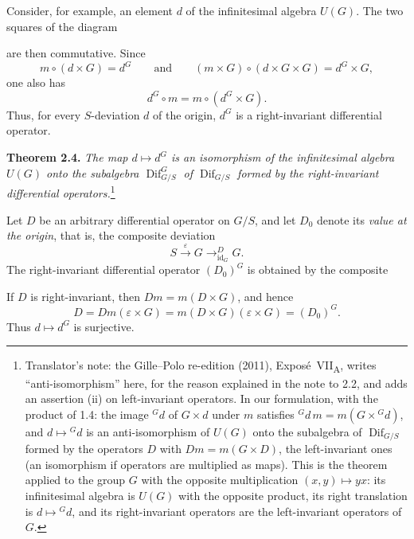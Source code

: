 Consider, for example, an element \(d\) of the infinitesimal algebra
\(U(G)\). The two squares of the diagram
\begin{center}
  \label{sga3:VIIA:2.3-origin-deviation-invariant}
  
\end{center}
are then commutative. Since
\[
  m\circ(d\times G)=d^G
  \qquad\text{and}\qquad
  (m\times G)\circ(d\times G\times G)=d^G\times G,
\]
one also has
\[
  d^G\circ m=m\circ(d^G\times G).
\]
Thus, for every \(S\)-deviation \(d\) of the origin, \(d^G\) is a
right-invariant differential operator.

\medskip
\noindent\textbf{Theorem 2.4.}
\label{sga3:VIIA:2.4}
\textit{The map \(d\mapsto d^G\) is an isomorphism of the infinitesimal
algebra \(U(G)\) onto the subalgebra \(\operatorname{Dif}^{G}_{G/S}\) of
\(\operatorname{Dif}_{G/S}\) formed by the right-invariant differential
operators.}\footnote{Translator's note: the Gille--Polo re-edition
(2011), Expos\'e~VII\textsubscript{A}, writes ``anti-isomorphism'' here,
for the reason explained in the note to 2.2, and adds an assertion (ii)
on left-invariant operators. In our formulation, with the product of
1.4: the image \({}^Gd\) of \(G\times d\) under \(m\) satisfies
\({}^Gd\,m=m(G\times{}^Gd)\), and \(d\mapsto{}^Gd\) is an
anti-isomorphism of \(U(G)\) onto the subalgebra of
\(\operatorname{Dif}_{G/S}\) formed by the operators \(D\) with
\(Dm=m(G\times D)\), the left-invariant ones (an isomorphism if
operators are multiplied as maps). This is the theorem applied to the
group \(G\) with the opposite multiplication \((x,y)\mapsto yx\): its
infinitesimal algebra is \(U(G)\) with the opposite product, its right
translation is \(d\mapsto{}^Gd\), and its right-invariant operators are
the left-invariant operators of \(G\).}

Let \(D\) be an arbitrary differential operator on \(G/S\), and let
\(D_0\) denote its \emph{value at the origin}, that is, the composite
deviation
\[
  S\xrightarrow{\varepsilon}G
   \mathop{\longrightarrow}^{D}_{\operatorname{id}_G}G.
\]
The right-invariant differential operator \((D_0)^G\) is obtained by
the composite
\begin{center}
  \label{sga3:VIIA:2.4-D0-composite}
  
\end{center}
If \(D\) is right-invariant, then \(Dm=m(D\times G)\), and hence
\[
  D=Dm(\varepsilon\times G)
   =m(D\times G)(\varepsilon\times G)
   =(D_0)^G.
\]
Thus \(d\mapsto d^G\) is surjective.

